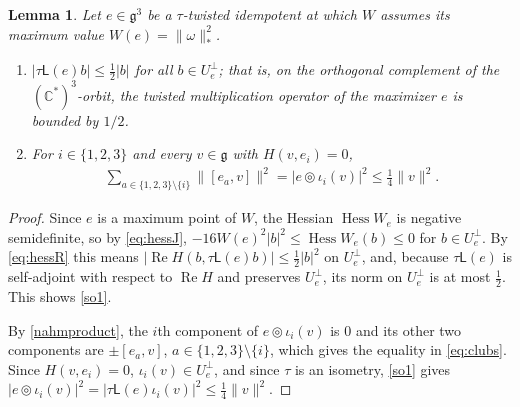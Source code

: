 \documentclass[leqno,10pt]{amsart}
\newtheorem{lemma}[theorem]{Lemma}%
\theoremstyle{definition}
\numberwithin{equation}{section}
\newcommand{\tmlt}{\circledcirc}
\newcommand{\om}{\omega}
\newcommand{\hess}{\operatorname{Hess}}
\newcommand{\lin}{\mathsf{L}}
\newcommand{\re}{\operatorname{Re}}
\newcommand{\g}{\mathfrak{g}}
\newcommand{\com}{\mathbb C}
\newcommand{\norm}[1]{\lVert #1\rVert}
\newcommand{\nnorm}[1]{\lvert #1\rvert}%
\newcommand{\comass}[1]{\lVert #1\rVert_{\ast}}%
\newcommand{\Usp}{U}
\newcommand{\Uperp}{\Usp^{\perp}}
\begin{document}
\begin{lemma}\label{lem:secondorder}
Let $e\in \g^{3}$ be a $\tau$-twisted idempotent at which $W$ assumes its maximum value $W(e) = \comass{\om}^{2}$.
\begin{enumerate}[label=(\arabic*), ref=(\arabic*)]
\item\label{so1} $\nnorm{\tau\lin(e)b} \leq \tfrac{1}{2}\nnorm{b}$ for all $b \in \Uperp_{e}$; that is, on the orthogonal complement of the $(\com^{\ast})^{3}$-orbit, the twisted multiplication operator of the maximizer $e$ is bounded by $1/2$.
\item\label{so2} For $i \in \{1, 2, 3\}$ and every $v \in \g$ with $H(v, e_{i}) = 0$,
\begin{align}\label{eq:clubs}
\sum_{a \in \{1, 2, 3\} \setminus \{i\}}\norm{[e_{a}, v]}^{2} = \nnorm{e \tmlt \iota_{i}(v)}^{2} \leq \tfrac{1}{4}\norm{v}^{2}.
\end{align}
\end{enumerate}
\end{lemma}
\begin{proof}
Since $e$ is a maximum point of $W$, the Hessian $\hess W_{e}$ is negative semidefinite, so by \eqref{eq:hessJ}, $-16W(e)^{2}\nnorm{b}^{2} \leq \hess W_{e}(b) \leq 0$ for $b \in \Uperp_{e}$. By \eqref{eq:hessR} this means $|\re H(b, \tau\lin(e)b)| \leq \tfrac{1}{2}\nnorm{b}^{2}$ on $\Uperp_{e}$, and, because $\tau\lin(e)$ is self-adjoint with respect to $\re H$ and preserves $\Uperp_{e}$, its norm on $\Uperp_{e}$ is at most $\tfrac{1}{2}$.
This shows \ref{so1}.

By \eqref{nahmproduct}, the $i$th component of $e \tmlt \iota_{i}(v)$ is $0$ and its other two components are $\pm[e_{a}, v]$, $a \in \{1, 2, 3\}\setminus\{i\}$, which gives the equality in \eqref{eq:clubs}. Since $H(v, e_{i}) = 0$, $\iota_{i}(v) \in \Uperp_{e}$, and since $\tau$ is an isometry, \ref{so1} gives $\nnorm{e \tmlt \iota_{i}(v)}^{2} = \nnorm{\tau\lin(e)\iota_{i}(v)}^{2} \leq \tfrac{1}{4}\norm{v}^{2}$.
\end{proof}
\end{document}
